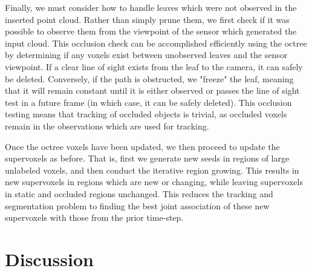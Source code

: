 Finally, we must consider how to handle leaves which were not observed in the inserted point cloud. Rather than simply prune them, we first check if it was possible to observe them from the viewpoint of the sensor which generated the input cloud. This occlusion check can be accomplished efficiently using the octree by determining if any voxels exist between unobserved leaves and the sensor viewpoint. If a clear line of sight exists from the leaf to the camera, it can safely be deleted. Conversely, if the path is obstructed, we "freeze" the leaf, meaning that it will remain constant until it is either observed or passes the line of sight test in a future frame (in which case, it can be safely deleted). This occlusion testing means that tracking of occluded objects is trivial, as occluded voxels remain in the observations which are used for tracking.

Once the octree voxels have been updated, we then proceed to update the supervoxels as before. That is, first we generate new seeds in regions of large unlabeled voxels, and then conduct the iterative region growing. This results in new supervoxels in regions which are new or changing, while leaving supervoxels in static and occluded regions unchanged. This reduces the tracking and segmentation problem to finding the best joint association of these new supervoxels with those from the prior time-step.

\section{Discussion}


